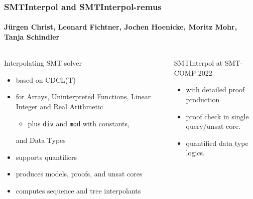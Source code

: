 \documentclass[table,aspectratio=169]{beamer}
\institute[Uni Freiburg]{University of Freiburg\hspace{1cm}\pgfuseimage{unifr}}
\begin{document}
\begin{frame}
  \frametitle{SMTInterpol and SMTInterpol-remus}
  \framesubtitle{J\"{u}rgen Christ, Leonard Fichtner, Jochen Hoenicke, Moritz Mohr, Tanja Schindler}
  
  \vspace{1ex}
  \begin{columns}[t]
  \begin{column}{.5\textwidth}
  Interpolating SMT solver
    \begin{itemize}
    \item based on CDCL(T)
      
    \item for Arrays, Uninterpreted Functions, Linear Integer and Real Arithmetic
    \begin{itemize}
      \item plus \texttt{div} and \texttt{mod} with constants,
    \end{itemize}
    and Data Types
    
    \item supports quantifiers
    
    \item produces models, proofs, and unsat cores
    
    \item computes sequence and tree interpolants
    \end{itemize}
  \end{column}
  
  \hfill\textcolor{ALUblue}{\vrule width 1pt }\hfill{}
  
  \begin{column}{.5\textwidth}
    SMTInterpol at SMT-COMP 2022
    \begin{itemize}
    \item with \alert{detailed proof production}
      
    \item \alert{proof check} in single query/unsat core.
    
    \item \alert{quantified data type} logics.
      
    \end{itemize}


\end{column}
\end{columns}
\end{frame}
\end{document}
